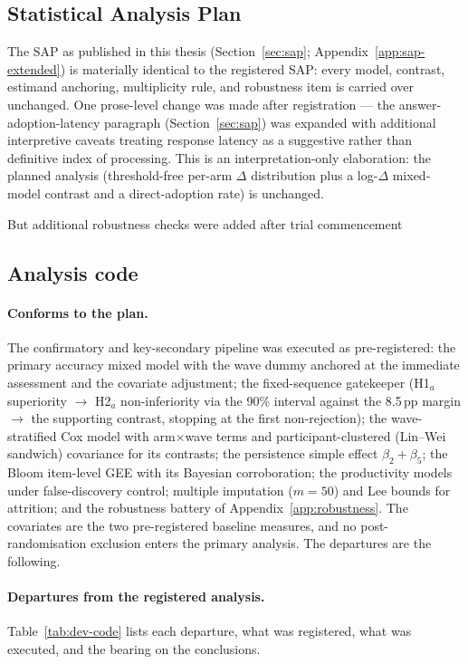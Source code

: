 \subsection{Statistical Analysis Plan}
\label{app:dev-sap}

The SAP as published in this thesis (Section~\ref{sec:sap};
Appendix~\ref{app:sap-extended}) is materially identical to the registered SAP:
every model, contrast, estimand anchoring, multiplicity rule, and robustness
item is carried over unchanged. One prose-level change was made after
registration --- the answer-adoption-latency paragraph
(Section~\ref{sec:sap}) was expanded with additional interpretive caveats
treating response latency as a suggestive rather than definitive index of
processing. This is an interpretation-only elaboration: the planned analysis
(threshold-free per-arm $\Delta$ distribution plus a log-$\Delta$ mixed-model
contrast and a direct-adoption rate) is unchanged. 

But additional robustness checks were added after trial commencement

\subsection{Analysis code}
\label{app:dev-code}

\paragraph{Conforms to the plan.} The confirmatory and key-secondary pipeline
was executed as pre-registered: the primary accuracy mixed model with the wave
dummy anchored at the immediate assessment and the covariate adjustment; the
fixed-sequence gatekeeper (H1$_a$ superiority $\rightarrow$ H2$_a$
non-inferiority via the 90\% interval against the 8.5\,pp margin $\rightarrow$
the supporting contrast, stopping at the first non-rejection); the wave-stratified
Cox model with arm$\times$wave terms and participant-clustered (Lin--Wei
sandwich) covariance for its contrasts; the persistence simple effect
$\beta_2+\beta_5$; the Bloom item-level GEE with its Bayesian corroboration; the
productivity models under false-discovery control; multiple imputation
($m=50$) and Lee bounds for attrition; and the robustness battery of
Appendix~\ref{app:robustness}. The covariates are the two pre-registered
baseline measures, and no post-randomisation exclusion enters the primary
analysis. The departures are the following.

\paragraph{Departures from the registered analysis.} Table~\ref{tab:dev-code}
lists each departure, what was registered, what was executed, and the bearing on
the conclusions.

